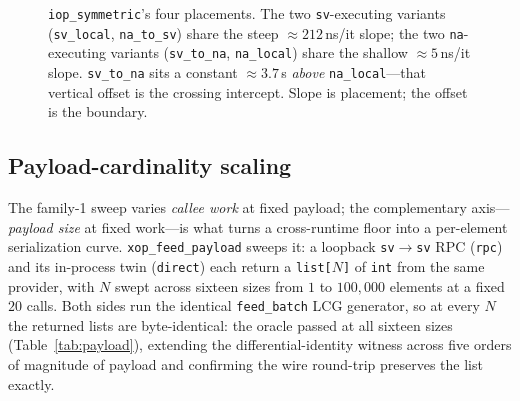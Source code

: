 \documentclass[conference]{IEEEtran}
\newcommand{\code}[1]{\texttt{#1}}
\begin{document}
\begin{figure}[t]
\centering
{}
\caption{\code{iop\_symmetric}'s four placements. The two \code{sv}-executing
variants (\code{sv\_local}, \code{na\_to\_sv}) share the steep $\approx$$212$\,ns/it
slope; the two \code{na}-executing variants (\code{sv\_to\_na}, \code{na\_local})
share the shallow $\approx$$5$\,ns/it slope. \code{sv\_to\_na} sits a constant
$\approx$$3.7$\,\textmu s \emph{above} \code{na\_local}---that vertical offset is
the crossing intercept. Slope is placement; the offset is the boundary.}
\label{fig:placement}
\end{figure}

\subsection{Payload-cardinality scaling}
\label{sec:payload}

The family-1 sweep varies \emph{callee work} at fixed payload; the complementary
axis---\emph{payload size} at fixed work---is what turns a cross-runtime floor
into a per-element serialization curve. \code{xop\_feed\_payload} sweeps it: a
loopback \code{sv$\rightarrow$sv} RPC (\code{rpc}) and its in-process twin
(\code{direct}) each return a \code{list[$N$]} of \code{int} from the same
provider, with $N$ swept across sixteen sizes from $1$ to $100{,}000$ elements at a
fixed $20$ calls. Both sides run the identical \code{feed\_batch} LCG generator,
so at every $N$ the returned lists are byte-identical: the oracle passed at all
sixteen sizes (Table~\ref{tab:payload}), extending the differential-identity
witness across five orders of magnitude of payload and confirming the wire
round-trip preserves the list exactly.
\end{document}
